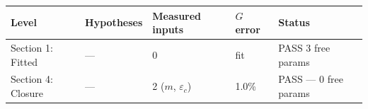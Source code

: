 \documentclass[
  11pt,
]{article}
\begin{document}
\begin{longtable}[]{@{}lllll@{}}
\toprule
\begin{minipage}[b]{0.17\columnwidth}\raggedright
Level\strut
\end{minipage} & \begin{minipage}[b]{0.17\columnwidth}\raggedright
Hypotheses\strut
\end{minipage} & \begin{minipage}[b]{0.17\columnwidth}\raggedright
Measured inputs\strut
\end{minipage} & \begin{minipage}[b]{0.17\columnwidth}\raggedright
\(G\) error\strut
\end{minipage} & \begin{minipage}[b]{0.17\columnwidth}\raggedright
Status\strut
\end{minipage}\tabularnewline
\midrule
\endhead
\begin{minipage}[t]{0.17\columnwidth}\raggedright
Section 1: Fitted\strut
\end{minipage} & \begin{minipage}[t]{0.17\columnwidth}\raggedright
---\strut
\end{minipage} & \begin{minipage}[t]{0.17\columnwidth}\raggedright
0\strut
\end{minipage} & \begin{minipage}[t]{0.17\columnwidth}\raggedright
fit\strut
\end{minipage} & \begin{minipage}[t]{0.17\columnwidth}\raggedright
PASS 3 free params\strut
\end{minipage}\tabularnewline
\begin{minipage}[t]{0.17\columnwidth}\raggedright
Section 4: Closure\strut
\end{minipage} & \begin{minipage}[t]{0.17\columnwidth}\raggedright
---\strut
\end{minipage} & \begin{minipage}[t]{0.17\columnwidth}\raggedright
2 (\(m\), \(\varepsilon_c\))\strut
\end{minipage} & \begin{minipage}[t]{0.17\columnwidth}\raggedright
1.0\%\strut
\end{minipage} & \begin{minipage}[t]{0.17\columnwidth}\raggedright
PASS --- 0 free params\strut
\end{minipage}\tabularnewline

\end{longtable}
\end{document}
